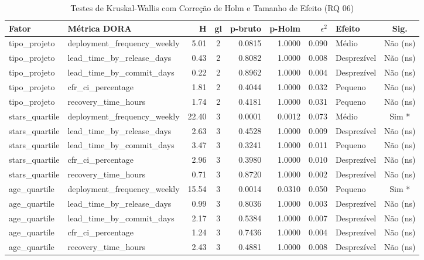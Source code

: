 \begin{table}[htbp]
\centering
\caption{Testes de Kruskal-Wallis com Correção de Holm e Tamanho de Efeito (RQ 06)}
\label{tab:rq06_kruskal}
\small
\begin{tabular}{|l|l|r|c|r|r|r|l|c|}
\hline
\textbf{Fator} & \textbf{Métrica DORA} & \textbf{H} & \textbf{gl} & \textbf{p-bruto} & \textbf{p-Holm} & \textbf{$\epsilon^2$} & \textbf{Efeito} & \textbf{Sig.} \\
\hline
tipo_projeto & deployment_frequency_weekly & 5.01 & 2 & 0.0815 & 1.0000 & 0.090 & Médio & Não (ns) \\
tipo_projeto & lead_time_by_release_days & 0.43 & 2 & 0.8082 & 1.0000 & 0.008 & Desprezível & Não (ns) \\
tipo_projeto & lead_time_by_commit_days & 0.22 & 2 & 0.8962 & 1.0000 & 0.004 & Desprezível & Não (ns) \\
tipo_projeto & cfr_ci_percentage & 1.81 & 2 & 0.4044 & 1.0000 & 0.032 & Pequeno & Não (ns) \\
tipo_projeto & recovery_time_hours & 1.74 & 2 & 0.4181 & 1.0000 & 0.031 & Pequeno & Não (ns) \\
stars_quartile & deployment_frequency_weekly & 22.40 & 3 & 0.0001 & 0.0012 & 0.073 & Médio & Sim * \\
stars_quartile & lead_time_by_release_days & 2.63 & 3 & 0.4528 & 1.0000 & 0.009 & Desprezível & Não (ns) \\
stars_quartile & lead_time_by_commit_days & 3.47 & 3 & 0.3241 & 1.0000 & 0.011 & Pequeno & Não (ns) \\
stars_quartile & cfr_ci_percentage & 2.96 & 3 & 0.3980 & 1.0000 & 0.010 & Desprezível & Não (ns) \\
stars_quartile & recovery_time_hours & 0.71 & 3 & 0.8720 & 1.0000 & 0.002 & Desprezível & Não (ns) \\
age_quartile & deployment_frequency_weekly & 15.54 & 3 & 0.0014 & 0.0310 & 0.050 & Pequeno & Sim * \\
age_quartile & lead_time_by_release_days & 0.99 & 3 & 0.8036 & 1.0000 & 0.003 & Desprezível & Não (ns) \\
age_quartile & lead_time_by_commit_days & 2.17 & 3 & 0.5384 & 1.0000 & 0.007 & Desprezível & Não (ns) \\
age_quartile & cfr_ci_percentage & 1.24 & 3 & 0.7436 & 1.0000 & 0.004 & Desprezível & Não (ns) \\
age_quartile & recovery_time_hours & 2.43 & 3 & 0.4881 & 1.0000 & 0.008 & Desprezível & Não (ns) \\

\end{tabular}
\end{table}
